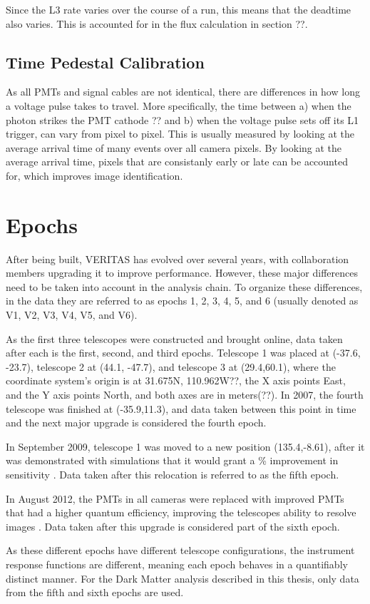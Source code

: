 Since the L3 rate varies over the course of a run, this means that the deadtime also varies.
This is accounted for in the flux calculation in section ??.

\subsection{Time Pedestal Calibration}
As all PMTs and signal cables are not identical, there are differences in how long a voltage pulse takes to travel.
More specifically, the time between a) when the photon strikes the PMT cathode ?? and b) when the voltage pulse sets off its L1 trigger, can vary from pixel to pixel.
This is usually measured by looking at the average arrival time of many events over all camera pixels.
By looking at the average arrival time, pixels that are consistanly early or late can be accounted for, which improves image identification.

\section{Epochs}\label{sec:epochs}
After being built, VERITAS has evolved over several years, with collaboration members upgrading it to improve performance.
However, these major differences need to be taken into account in the analysis chain.
To organize these differences, in the data they are referred to as epochs 1, 2, 3, 4, 5, and 6 (usually denoted as V1, V2, V3, V4, V5, and V6).

As the first three telescopes were constructed and brought online, data taken after each is the first, second, and third epochs.
Telescope 1 was placed at (-37.6, -23.7), telescope 2 at (44.1, -47.7), and telescope 3 at (29.4,60.1), where the coordinate system's origin is at 31.675N, 110.962W??, the X axis points East, and the Y axis points North, and both axes are in meters(??).
In 2007, the fourth telescope was finished at (-35.9,11.3), and data taken between this point in time and the next major upgrade is considered the fourth epoch.

In September 2009, telescope 1 was moved to a new position (135.4,-8.61), after it was demonstrated with simulations that it would grant a \% improvement in sensitivity \cite{veritas_t1_move}.
Data taken after this relocation is referred to as the fifth epoch.

In August 2012, the PMTs in all cameras were replaced with improved PMTs that had a higher quantum efficiency, improving the telescopes ability to resolve images \cite{pmtmodels}.
Data taken after this upgrade is considered part of the sixth epoch.

As these different epochs have different telescope configurations, the instrument response functions are different, meaning each epoch behaves in a quantifiably distinct manner.
For the Dark Matter analysis described in this thesis, only data from the fifth and sixth epochs are used.


